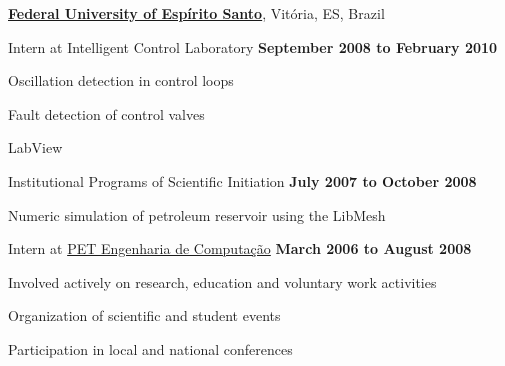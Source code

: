 \documentclass[10pt]{article}
\begin{document}
\href{http://www.ufes.br}{\textbf{Federal University of Espírito Santo}},
Vitória, ES, Brazil
\begin{outerlist}
    
\item[] Intern at Intelligent Control Laboratory
    \hfill \textbf{September 2008 to February 2010}
    \begin{innerlist}
    \item Oscillation detection in control loops
    \item Fault detection of control valves
    \item LabView
    \end{innerlist}

\item[] Institutional Programs of Scientific Initiation
    \hfill \textbf{July 2007 to October 2008}
    \begin{innerlist}
    \item Numeric simulation of petroleum reservoir using the LibMesh
    \end{innerlist}

\item[] Intern at \href{http://www.ufes.br/~pet}{PET Engenharia de Computação}
    \hfill \textbf{March 2006 to August 2008}
    \begin{innerlist}
    \item Involved actively on research, education and voluntary work activities
    \item Organization of scientific and student events
    \item Participation in local and national conferences
    \end{innerlist}

\end{outerlist}
\end{document}
